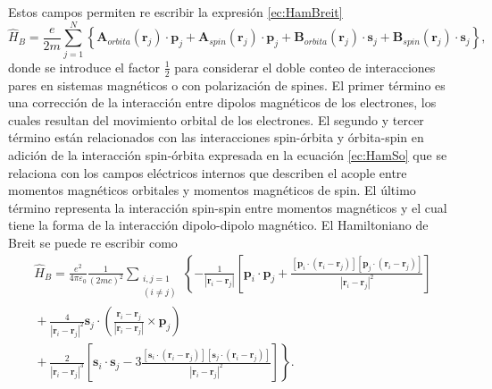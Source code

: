 Estos campos permiten re escribir la expresi\'on \ref{ec:HamBreit} \cite{Scott_1980}   
\begin{equation}
	\hat{H}_B= \frac{e}{2m} \sum_{j=1}^N \left\{\pmb{A}_{orbita} (\pmb{r}_j) \cdot \pmb{p}_j + \pmb{A}_{spin} (\pmb{r}_j) \cdot \pmb{p}_j + \pmb{B}_{orbita} (\pmb{r}_j) \cdot \pmb{s}_j +\pmb{B}_{spin} (\pmb{r}_j) \cdot \pmb{s}_j \right\} \label{ec:breitHam},
\end{equation}
donde se introduce el factor $\frac{1}{2}$ para considerar el doble conteo de interacciones pares en sistemas magn\'eticos o con polarizaci\'on de spines. El primer t\'ermino es una correcci\'on de la interacci\'on entre dipolos magn\'eticos de los electrones, los cuales resultan del movimiento orbital de los electrones. El segundo y tercer t\'ermino est\'an relacionados con las interacciones spin-\'orbita y \'orbita-spin en adici\'on de la interacci\'on spin-\'orbita expresada en la ecuaci\'on \ref{ec:HamSo} que se relaciona con los campos el\'ectricos internos que describen el acople entre momentos magn\'eticos orbitales y momentos magn\'eticos de spin. El \'ultimo t\'ermino representa la interacci\'on spin-spin entre momentos magn\'eticos y el cual tiene la forma de la interacci\'on dipolo-dipolo magn\'etico. El Hamiltoniano de Breit se puede re escribir como \cite{Scott_1980}
\begin{multline}
	\hat{H}_B = \frac{e^2}{4 \pi \varepsilon_0} \frac{1}{(2 m c)^2} \sum_{\substack{i,j = 1 \\ (i \not = j)}} \left\{- \frac{1}{|\pmb{r}_i-\pmb{r}_j|} \left[\pmb{p}_i \cdot \pmb{p}_j + \frac{[\pmb{p}_i \cdot (\pmb{r}_i-\pmb{r}_j)][\pmb{p}_j \cdot (\pmb{r}_i-\pmb{r}_j)]}{|\pmb{r}_i-\pmb{r}_j|^2} \right] \right. \\ \left. {} + \frac{4}{|\pmb{r}_i-\pmb{r}_j|^2} \pmb{s}_j \cdot \left(\frac{\pmb{r}_i-\pmb{r}_j}{|\pmb{r}_i-\pmb{r}_j|} \times \pmb{p}_j \right) \right. \\
	\left. {} + \frac{2}{|\pmb{r}_i-\pmb{r}_j|^3} \left[\pmb{s}_i \cdot \pmb{s}_j - 3 \frac{[\pmb{s}_i \cdot (\pmb{r}_i - \pmb{r}_j)][\pmb{s}_j \cdot (\pmb{r}_i - \pmb{r}_j)] }{|\pmb{r}_i-\pmb{r}_j|^2} \right] \right\}. \label{ec:HamBreit2}
\end{multline}

